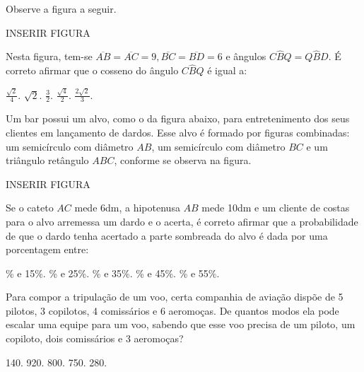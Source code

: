 \begin{question}%
Observe a figura a seguir.

INSERIR FIGURA

Nesta figura, tem-se \(\overline{AB} = \overline{AC} = 9, \overline{BC} = \overline{BD} = 6\) e ângulos \(C\hat{B}Q = Q\hat{B}D\). É correto afirmar que o cosseno do ângulo \(C\hat{B}Q\) é igual a:
    \begin{tasks}
        \task \(\frac{\sqrt{2}}{4}\).
        \task \(\sqrt{2}\).
        \task \(\frac{3}{2}\).
        \task \(\frac{\sqrt{4}}{2}\).
        \task \(\frac{2\sqrt{2}}{3}\).
    \end{tasks}
\end{question}

\begin{question}%
Um bar possui um alvo, como o da figura abaixo, para entretenimento dos seus clientes em lançamento de dardos. Esse alvo é formado por figuras combinadas: um semicírculo com diâmetro \(AB\), um semicírculo com diâmetro \(BC\) e um triângulo retângulo \(ABC\), conforme se observa na figura.

INSERIR FIGURA

Se o cateto \(AC\) mede 6dm, a hipotenusa \(AB\) mede 10dm e um cliente de costas para o alvo arremessa um dardo e o acerta, é correto afirmar que a probabilidade de que o dardo tenha acertado a parte sombreada do alvo é dada por uma porcentagem entre:
    \begin{tasks}
        \% e 15\%.
        \% e 25\%.
        \% e 35\%.
        \% e 45\%.
        \% e 55\%.
    \end{tasks}
\end{question}

\begin{question}%
Para compor a tripulação de um voo, certa companhia de aviação dispõe de 5 pilotos, 3 copilotos, 4 comissários e 6 aeromoças. De quantos modos ela pode escalar uma equipe para um voo, sabendo que esse voo precisa de um piloto, um copiloto, dois comissários e 3 aeromoças?
    \begin{tasks}
         140.
         920.
         800.
         750.
         280.
    \end{tasks}
\end{question}

